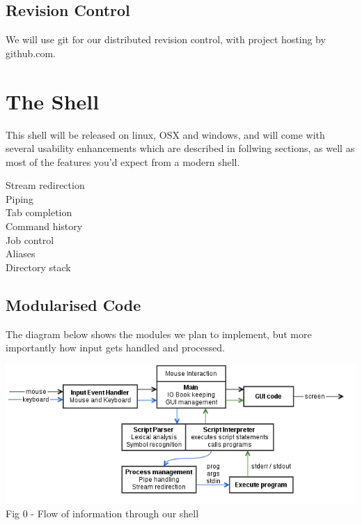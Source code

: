 \documentclass[a4paper,12pt]{article}
\begin{document}
\subsection*{Revision Control}
We will use git for our distributed revision control, with project hosting by github.com.
\section*{The Shell}
This shell will be released on linux, OSX and windows, and will come with several usability enhancements which are described in follwing sections, as well as most of the features you'd expect from a modern shell.
\begin{multicols}{4}
  \noindent
  Stream redirection \\
  Piping \\
  Tab completion \\
  Command history \\
  Job control \\
  Aliases \\
  Directory stack
\end{multicols}
\subsection*{Modularised Code}

The diagram below shows the modules we plan to implement, but more importantly how input gets handled and processed.

\begin{center}
  \includegraphics[width=16cm]{shellflow.png}\\
  \small Fig 0 - Flow of information through our shell
\end{center}

\pagebreak
\end{document}
